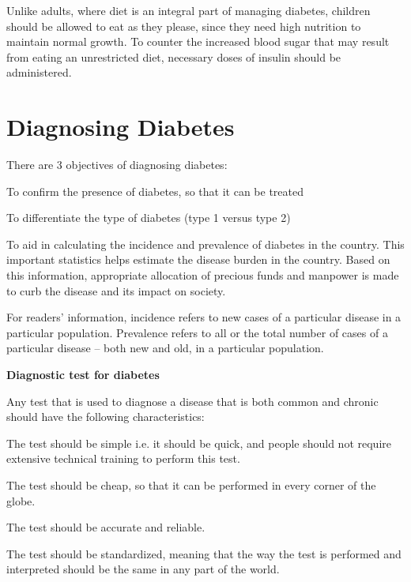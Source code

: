  Unlike adults, where diet is an integral part of managing diabetes, children should be allowed to eat as they please, since they need high nutrition to maintain normal growth. To counter the increased blood sugar that may result from eating an unrestricted diet, necessary doses of insulin should be administered.

\chapter{Diagnosing Diabetes}

There are 3 objectives of diagnosing diabetes:

\item To confirm the presence of diabetes, so that it can be treated

 \item To differentiate the type of diabetes (type 1 versus type 2)

 \item To aid in calculating the incidence and prevalence of diabetes in the country. This important statistics helps estimate the disease burden in the country. Based on this information, appropriate allocation of precious funds and manpower is made to curb the disease and its impact on society.

For readers’ information, incidence refers to new cases of a particular disease in a particular population. Prevalence refers to all or the total number of cases of a particular disease – both new and old, in a particular population.

\textbf{Diagnostic test for diabetes}

Any test that is used to diagnose a disease that is both common and chronic should have the following characteristics:

\item The test should be simple i.e. it should be quick, and people should not require extensive technical training to perform this test.

 \item The test should be cheap, so that it can be performed in every corner of the globe.

 \item The test should be accurate and reliable.

 \item The test should be standardized, meaning that the way the test is performed and interpreted should be the same in any part of the world.

